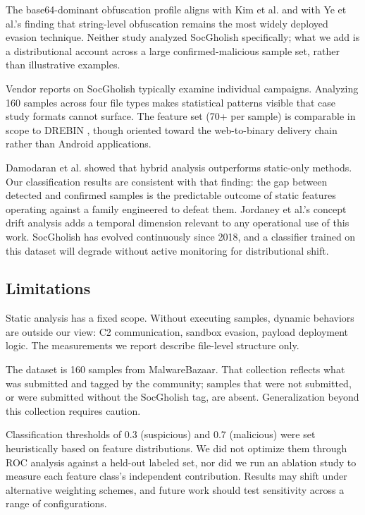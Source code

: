 \documentclass[pdflatex,sn-mathphys-num]{sn-jnl}
\theoremstyle{thmstyleone}%
\theoremstyle{thmstyletwo}%
\theoremstyle{thmstylethree}%
\begin{document}
The base64-dominant obfuscation profile aligns with Kim et al. \cite{kim2022} and with Ye et al.'s \cite{ye2017} finding that string-level obfuscation remains the most widely deployed evasion technique. Neither study analyzed SocGholish specifically; what we add is a distributional account across a large confirmed-malicious sample set, rather than illustrative examples.

Vendor reports on SocGholish \cite{proofpoint2022, secureworks2020} typically examine individual campaigns. Analyzing 160 samples across four file types makes statistical patterns visible that case study formats cannot surface. The feature set (70+ per sample) is comparable in scope to DREBIN \cite{arp2014}, though oriented toward the web-to-binary delivery chain rather than Android applications.

Damodaran et al. \cite{damodaran2017} showed that hybrid analysis outperforms static-only methods. Our classification results are consistent with that finding: the gap between detected and confirmed samples is the predictable outcome of static features operating against a family engineered to defeat them. Jordaney et al.'s \cite{jordaney2017} concept drift analysis adds a temporal dimension relevant to any operational use of this work. SocGholish has evolved continuously since 2018, and a classifier trained on this dataset will degrade without active monitoring for distributional shift.

\subsection{Limitations}\label{subsec:limitations}

Static analysis has a fixed scope. Without executing samples, dynamic behaviors are outside our view: C2 communication, sandbox evasion, payload deployment logic. The measurements we report describe file-level structure only.

The dataset is 160 samples from MalwareBazaar. That collection reflects what was submitted and tagged by the community; samples that were not submitted, or were submitted without the SocGholish tag, are absent. Generalization beyond this collection requires caution.

Classification thresholds of 0.3 (suspicious) and 0.7 (malicious) were set heuristically based on feature distributions. We did not optimize them through ROC analysis against a held-out labeled set, nor did we run an ablation study to measure each feature class's independent contribution. Results may shift under alternative weighting schemes, and future work should test sensitivity across a range of configurations.
\end{document}

